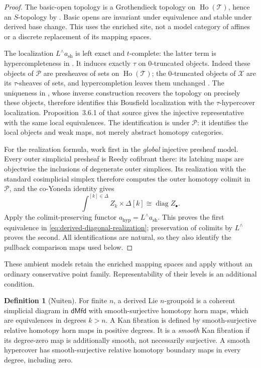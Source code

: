 \documentclass[12pt]{amsart}
\theoremstyle{definition}
\newtheorem{defn}[thm]{Definition}
\theoremstyle{remark}
\numberwithin{equation}{section}
\newcommand{\CT}{\mathcal T}
\newcommand{\dMfd}{\mathsf{dMfd}}
\begin{document}
\begin{proof}
The basic-open topology is a Grothendieck topology on
$\operatorname{Ho}(\CT)$, hence an $S$-topology by
\cite[Definition~3.1.1]{HAGI2005}.
Basic opens are invariant under equivalence and stable under
derived base change. This uses the enriched site, not a model
category of affines or a discrete replacement of its mapping spaces.

The localization $L^\wedge a_{\mathrm{sh}}$ is left exact and
$t$-complete: the latter term is hypercompleteness in
\cite[Remark~6.5.2.11 and Lemma~6.5.2.12, p.~669]{LurieHTT2009}.
It induces exactly $\tau$ on $0$-truncated objects.
Indeed these objects of $\mathcal P$ are presheaves of sets on
$\operatorname{Ho}(\CT)$; the $0$-truncated objects of $\mathcal X$ are its
$\tau$-sheaves of sets, and hypercompletion leaves them unchanged
\cite[Lemma~6.5.2.9, p.~669]{LurieHTT2009}.
The uniqueness in \cite[Theorem~3.8.3]{HAGI2005},
whose inverse construction recovers the topology on precisely
these objects, therefore identifies this Bousfield localization
with the $\tau$-hypercover localization.
Proposition~3.6.1 of that source gives the injective representative
with the same local equivalences. The identification is under
$\mathcal P$: it identifies the local objects and weak maps,
not merely abstract homotopy categories.

For the realization formula, work first in the \emph{global}
injective presheaf model. Every outer simplicial presheaf is
Reedy cofibrant there: its latching maps are objectwise the
inclusions of degenerate outer simplices. Its realization
with the standard cosimplicial simplex therefore computes
the outer homotopy colimit in $\mathcal P$, and the co-Yoneda
identity gives
\[
 \int^{[k]\in\Delta} Z_k\times\Delta[k]
 \cong \operatorname{diag}Z_\bullet.
\]
Apply the colimit-preserving functor
$a_{\mathrm{hyp}}=L^\wedge a_{\mathrm{sh}}$.
This proves the first equivalence in
\eqref{eq:derived-diagonal-realization}; preservation of
colimits by $L^\wedge$ proves the second. All identifications
are natural, so they also identify the pullback comparison maps
used below.
\end{proof}

These ambient models retain the enriched mapping spaces and
apply without an ordinary conservative point family.
Representability of their levels is an additional condition.

\begin{defn}[Nuiten]\label{def:derived-geometric-groupoids}
For finite $n$, a derived Lie $n$-groupoid is a coherent simplicial
diagram in $\dMfd$ with smooth-surjective homotopy horn maps,
which are equivalences in degrees $k>n$.
A Kan fibration is defined by smooth-surjective relative homotopy
horn maps in positive degrees.
It is a \emph{smooth} Kan fibration if its degree-zero map is
additionally smooth, not necessarily surjective.
A smooth hypercover has smooth-surjective relative homotopy
boundary maps in every degree, including zero.
\end{defn}
\end{document}
